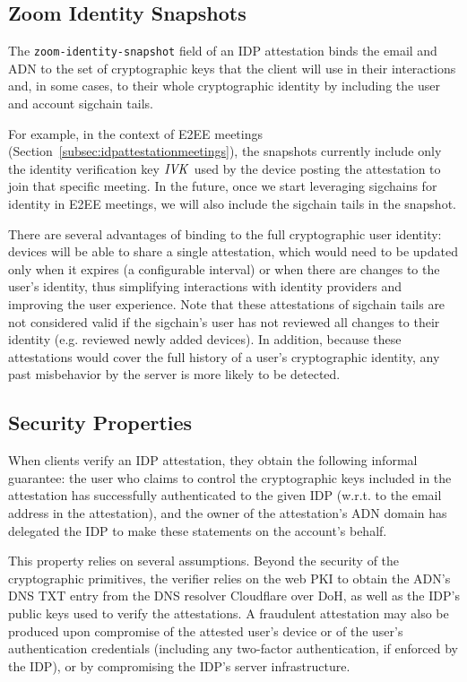 \subsection{Zoom Identity Snapshots}
\label{subsec:snapshots}

The \texttt{zoom-identity-snapshot} field of an IDP attestation binds the email and ADN to the
set of cryptographic keys that the client will use in their interactions and, in some cases, to
their whole cryptographic identity by including the user and account sigchain tails.

For example, in the context of E2EE meetings
(Section~\ref{subsec:idpattestationmeetings}), the snapshots currently include
only the identity verification key $\mathit{IVK}$ used by the device posting the
attestation to join that specific meeting. In the future, once we start
leveraging sigchains for identity in E2EE meetings, we will also include the
sigchain tails in the snapshot. 

There are several advantages of binding to the full cryptographic user identity:
devices will be able to share a single attestation, which would need to be
updated only when it expires (a configurable interval) or when there are changes
to the user's identity, thus simplifying interactions with identity providers
and improving the user experience. Note that these attestations of sigchain
tails are not considered valid if the sigchain's user has not reviewed all
changes to their identity (e.g. reviewed newly added devices). In addition,
because these attestations would cover the full history of a user's
cryptographic identity, any past misbehavior by the
server is more likely to be detected.

\subsection{Security Properties}\label{subsec:idpsecurity}

When clients verify an IDP attestation, they obtain the following informal
guarantee: the user who claims to control the cryptographic keys included in the
attestation has successfully authenticated to the given IDP (w.r.t. to the email
address in the attestation), and the owner of the attestation's ADN domain has
delegated the IDP to make these statements on the account's behalf.

This property relies on several assumptions. Beyond the security of the
cryptographic primitives, the verifier relies on the web PKI to obtain the ADN's
DNS TXT entry from the DNS resolver Cloudflare over DoH, as well as the IDP's
public keys used to verify the attestations.
A fraudulent attestation may also be produced upon compromise of the attested user's
device or of the user's authentication credentials (including any two-factor
authentication, if enforced by the IDP), or by compromising the IDP's server infrastructure.

